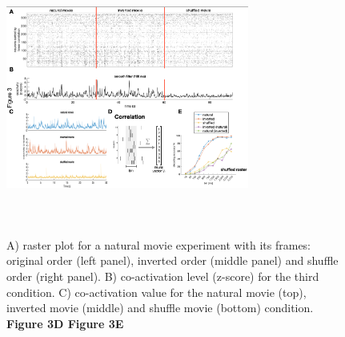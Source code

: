 \documentclass[9pt,twocolumn,twoside,lineno]{pnas-new}
\begin{document}
\begin{figure}
\centering
\includegraphics[width=8cm,height=9cm]{Fig 3.png}
\caption{A) raster plot for a natural movie experiment with its frames: original order (left panel), inverted order (middle panel) and shuffle order (right panel). B) co-activation level (z-score) for the third condition. C) co-activation value for the natural movie (top), inverted movie (middle) and shuffle movie (bottom) condition. \textbf{Figure 3D Figure 3E}}
\label{fig:Figure_3.pdf}
\end{figure}

\end{document}
